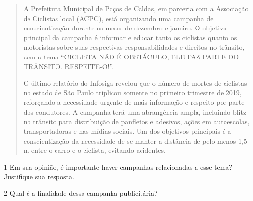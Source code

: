 

\begin{quote}
A Prefeitura Municipal de Poços de Caldas, em parceria com a Associação
de Ciclistas local (ACPC), está organizando uma campanha de
conscientização durante os meses de dezembro e janeiro. O objetivo
principal da campanha é informar e educar tanto os ciclistas quanto os
motoristas sobre suas respectivas responsabilidades e direitos no
trânsito, com o tema ``CICLISTA NÃO É OBSTÁCULO, ELE FAZ PARTE DO
TRÂNSITO. RESPEITE-O!''.

O último relatório do Infosiga revelou que o número de mortes de
ciclistas no estado de São Paulo triplicou somente no primeiro trimestre
de 2019, reforçando a necessidade urgente de mais informação e respeito
por parte dos condutores. A campanha terá uma abrangência ampla,
incluindo blitz no trânsito para distribuição de panfletos e adesivos,
ações em autoescolas, transportadoras e nas mídias sociais. Um dos
objetivos principais é a conscientização da necessidade de se manter a
distância de pelo menos 1,5 m entre o carro e o ciclista, evitando
acidentes.

\end{quote}

\num{1} Em sua opinião, é importante haver campanhas relacionadas a esse tema? Justifique sua resposta.


\num{2} Qual é a finalidade dessa campanha publicitária?


